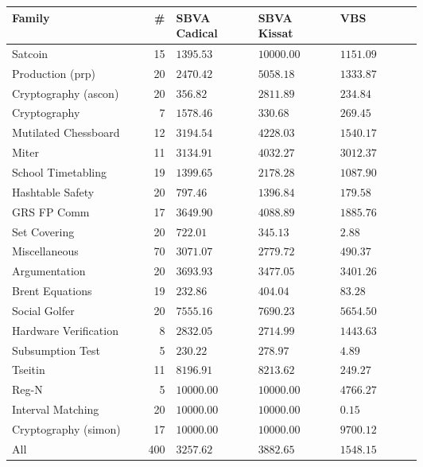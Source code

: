 \begin{tabular}{lr|>{\raggedleft\arraybackslash}p{0.20\linewidth}>{\raggedleft\arraybackslash}p{0.20\linewidth}|>{\raggedleft\arraybackslash}p{0.20\linewidth}}
\toprule
Family & \# & SBVA Cadical & SBVA Kissat & VBS \\
\midrule
Satcoin & 15 & \bfseries $1395.53$ & $10000.00$ & $1151.09$ \\
Production (prp) & 20 & \bfseries $2470.42$ & $5058.18$ & $1333.87$ \\
Cryptography (ascon) & 20 & \bfseries $356.82$ & $2811.89$ & $234.84$ \\
Cryptography & 7 & $1578.46$ & \bfseries $330.68$ & $269.45$ \\
Mutilated Chessboard & 12 & \bfseries $3194.54$ & $4228.03$ & $1540.17$ \\
Miter & 11 & \bfseries $3134.91$ & $4032.27$ & $3012.37$ \\
School Timetabling & 19 & \bfseries $1399.65$ & $2178.28$ & $1087.90$ \\
Hashtable Safety & 20 & \bfseries $797.46$ & $1396.84$ & $179.58$ \\
GRS FP Comm & 17 & \bfseries $3649.90$ & $4088.89$ & $1885.76$ \\
Set Covering & 20 & $722.01$ & \bfseries $345.13$ & $2.88$ \\
Miscellaneous & 70 & $3071.07$ & \bfseries $2779.72$ & $490.37$ \\
Argumentation & 20 & $3693.93$ & \bfseries $3477.05$ & $3401.26$ \\
Brent Equations & 19 & \bfseries $232.86$ & $404.04$ & $83.28$ \\
Social Golfer & 20 & \bfseries $7555.16$ & $7690.23$ & $5654.50$ \\
Hardware Verification & 8 & $2832.05$ & \bfseries $2714.99$ & $1443.63$ \\
Subsumption Test & 5 & \bfseries $230.22$ & $278.97$ & $4.89$ \\
Tseitin & 11 & \bfseries $8196.91$ & $8213.62$ & $249.27$ \\
Reg-N & 5 & \bfseries $10000.00$ & \bfseries $10000.00$ & $4766.27$ \\
Interval Matching & 20 & \bfseries $10000.00$ & \bfseries $10000.00$ & $0.15$ \\
Cryptography (simon) & 17 & \bfseries $10000.00$ & \bfseries $10000.00$ & $9700.12$ \\
\hline All & 400 & \bfseries $3257.62$ & $3882.65$ & $1548.15$ \\
\bottomrule
\end{tabular}
